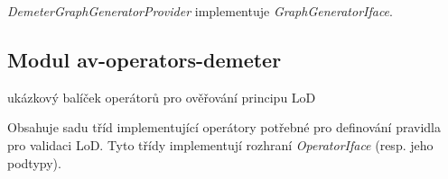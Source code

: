 \emph{DemeterGraphGeneratorProvider} implementuje \emph{GraphGeneratorIface}.

\subsection{Modul av-operators-demeter}
ukázkový balíček operátorů pro ověřování principu LoD

Obsahuje sadu tříd implementující operátory potřebné pro definování pravidla pro validaci LoD. Tyto třídy implementují rozhraní \emph{OperatorIface} (resp. jeho podtypy).
